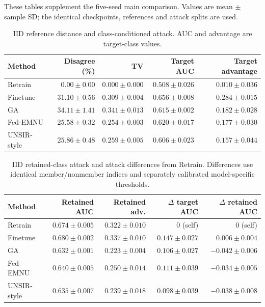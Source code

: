 \documentclass[software,article,submit,moreauthors]{Definitions/mdpi}
\begin{document}
These tables supplement the five-seed main comparison. Values are mean $\pm$
sample SD; the identical checkpoints, references and attack splits are used.
\begin{table}[H]\centering\small
\caption{IID reference distance and class-conditioned attack. AUC and advantage are target-class values.}
\label{tab:iid-distance}
\begin{tabular}{lrrrr}\toprule Method & Disagree (\%) & TV & Target AUC & Target advantage\\\midrule
Retrain & $0.00 \pm 0.00$ & $0.000 \pm 0.000$ & $0.508 \pm 0.026$ & $0.010 \pm 0.036$\\
Finetune & $31.10 \pm 0.56$ & $0.309 \pm 0.004$ & $0.656 \pm 0.008$ & $0.284 \pm 0.015$\\
GA & $34.11 \pm 1.41$ & $0.341 \pm 0.013$ & $0.615 \pm 0.002$ & $0.182 \pm 0.028$\\
Fed-EMNU & $25.58 \pm 0.32$ & $0.254 \pm 0.003$ & $0.620 \pm 0.017$ & $0.177 \pm 0.030$\\
UNSIR-style & $25.86 \pm 0.48$ & $0.259 \pm 0.005$ & $0.606 \pm 0.023$ & $0.157 \pm 0.044$\\
\bottomrule\end{tabular}\end{table}

\begin{table}[H]\centering\small
\caption{IID retained-class attack and attack differences from Retrain. Differences use identical member/nonmember indices and separately calibrated model-specific thresholds.}
\label{tab:iid-attack}
\begin{tabular}{lrrrr}\toprule Method & Retained AUC & Retained adv. & $\Delta$ target AUC & $\Delta$ retained AUC\\\midrule
Retrain & $0.674 \pm 0.005$ & $0.322 \pm 0.010$ & 0 (self) & 0 (self)\\
Finetune & $0.680 \pm 0.002$ & $0.337 \pm 0.010$ & $0.147 \pm 0.027$ & $0.006 \pm 0.004$\\
GA & $0.632 \pm 0.001$ & $0.223 \pm 0.004$ & $0.106 \pm 0.027$ & $-0.042 \pm 0.006$\\
Fed-EMNU & $0.640 \pm 0.005$ & $0.250 \pm 0.014$ & $0.111 \pm 0.039$ & $-0.034 \pm 0.005$\\
UNSIR-style & $0.635 \pm 0.007$ & $0.239 \pm 0.018$ & $0.098 \pm 0.039$ & $-0.038 \pm 0.008$\\
\bottomrule\end{tabular}\end{table}
\end{document}
